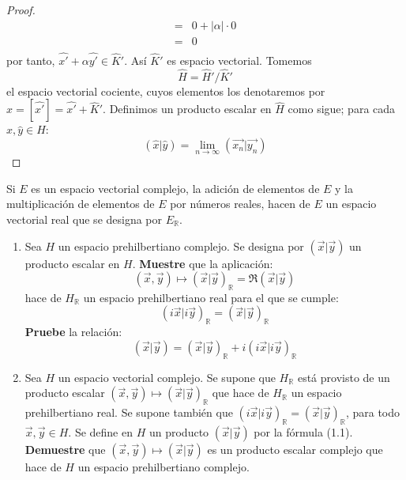 \documentclass[12pt]{report}
\theoremstyle{largebreak}
\newcommand\abs[1]{\ensuremath{\big|#1\big|}}
\newcommand\pint[2]{\ensuremath{\left(#1\big|#2\right)}}
\begin{document}
\begin{proof}
\begin{equation*}
\begin{split}
                =&0+\abs{\alpha}\cdot0\\
                =&0\\
            \end{split}
        \end{equation*}
        por tanto, $\hat{x'}+\alpha\hat{y'}\in\hat{K}'$. Así $\hat{K}'$ es espacio vectorial. Tomemos
        \begin{equation*}
            \hat{H}=\hat{H}'/\hat{K}'
        \end{equation*}
        el espacio vectorial cociente, cuyos elementos los denotaremos por $\hat{x}=[\hat{x'}]=\hat{x'}+\hat{K}'$. Definimos un producto escalar en $\hat{H}$ como sigue; para cada $\hat{x},\hat{y}\in H$:
        \begin{equation*}
            \pint{\hat{x}}{\hat{y}}=\lim_{n\rightarrow\infty }\pint{\vec{x_n}}{\vec{y_n}}
        \end{equation*}

    \end{proof}

    \begin{excer}
        Si $E$ es un espacio vectorial complejo, la adición de elementos de $E$ y la multiplicación de elementos de $E$ por números reales, hacen de $E$ un espacio vectorial real que se designa por $E_\mathbb{R}$.
        \begin{enumerate}
            \item Sea $H$ un espacio prehilbertiano complejo. Se designa por $\pint{\vec{x}}{\vec{y}}$ un producto escalar en $H$. \textbf{Muestre} que la aplicación:
            \begin{equation*}
                (\vec{x},\vec{y})\mapsto\pint{\vec{x}}{\vec{y}}_\mathbb{R}=\Re\pint{\vec{x}}{\vec{y}}
            \end{equation*}
            hace de $H_\mathbb{R}$ un espacio prehilbertiano real para el que se cumple:
            \begin{equation*}
                \pint{i\vec{x}}{i\vec{y}}_\mathbb{R}=\pint{\vec{x}}{\vec{y}}_\mathbb{R}
            \end{equation*}
            \textbf{Pruebe} la relación:
            \begin{equation}
                \pint{\vec{x}}{\vec{y}}=\pint{\vec{x}}{\vec{y}}_\mathbb{R}+i\pint{i\vec{x}}{i\vec{y}}_\mathbb{R}
            \end{equation}
            \item Sea $H$ un espacio vectorial complejo. Se supone que $H_\mathbb{R}$ está provisto de un producto escalar $(\vec{x},\vec{y})\mapsto\pint{\vec{x}}{\vec{y}}_\mathbb{R}$ que hace de $H_\mathbb{R}$ un espacio prehilbertiano real. Se supone también que $\pint{i\vec{x}}{i\vec{y}}_\mathbb{R}=\pint{\vec{x}}{\vec{y}}_\mathbb{R}$, para todo $\vec{x},\vec{y}\in H$. Se define en $H$ un producto $\pint{\vec{x}}{\vec{y}}$ por la fórmula (1.1). \textbf{Demuestre} que $(\vec{x},\vec{y})\mapsto\pint{\vec{x}}{\vec{y}}$ es un producto escalar complejo que hace de $H$ un espacio prehilbertiano complejo. 
        \end{enumerate}
    \end{excer}
\end{document}
